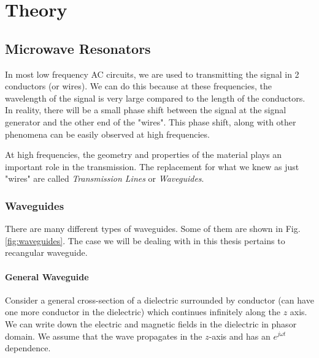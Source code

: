 
\chapter{Theory} %

\label{Chapter2} %


\section{Microwave Resonators}

In most low frequency AC circuits, we are used to transmitting the signal in 2 conductors (or wires). We can do this because at these frequencies, the wavelength of the signal is very large compared to the length of the conductors. In reality, there will be a small phase shift between the signal at the signal generator and the other end of the "wires". This phase shift, along with other phenomena can be easily observed at high frequencies.

At high frequencies, the geometry and properties of the material plays an important role in the transmission. The replacement for what we knew as just "wires" are called \textit{Transmission Lines} or \textit{Waveguides}.

\subsection{Waveguides}

There are many different types of waveguides. Some of them are shown in Fig. \ref{fig:waveguides}. The case we will be dealing with in this thesis pertains to recangular waveguide.


\subsubsection{General Waveguide}

Consider a general cross-section of a dielectric surrounded by conductor (can have one more conductor in the dielectric) which continues infinitely along the $z$ axis. We can write down the electric and magnetic fields in the dielectric in phasor domain. We assume that the wave propagates in the $z$-axis and has an $e^{j\omega t}$ dependence.

